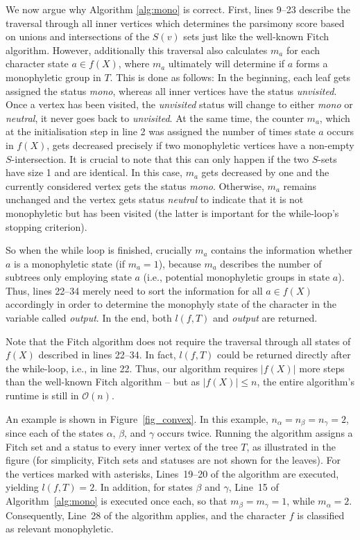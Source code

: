 \documentclass{amsart}
\theoremstyle{definition}
\begin{document}
We now argue why Algorithm \ref{alg:mono} is correct. First, lines 9--23 describe the traversal through all inner vertices which determines the parsimony score based on unions and intersections of the $S(v)$ sets just like the well-known Fitch algorithm. However, additionally this traversal also calculates $m_a$ for each character state $a \in f(X)$, where $m_a$ ultimately will determine if $a$ forms a monophyletic group in $T$. This is done as follows: In the beginning, each leaf gets assigned the status \emph{mono}, whereas all inner vertices have the status \emph{unvisited}. Once a vertex has been visited, the \emph{unvisited} status will change to either \emph{mono} or \emph{neutral}, it never goes back to \emph{unvisited}. At the same time, the counter $m_a$, which at the initialisation step in line 2 was assigned the number of times state $a$ occurs in $f(X)$, gets decreased precisely if two monophyletic vertices have a non-empty $S$-intersection. It is crucial to note that this can only happen if the two $S$-sets have size 1 and are identical. In this case, $m_a$ gets decreased by one and the currently considered vertex gets the status \emph{mono}. Otherwise, $m_a$ remains unchanged and the vertex gets status \emph{neutral} to indicate that it is not monophyletic but has been visited (the latter is important for the while-loop's stopping criterion). 

So when the while loop is finished, crucially $m_a$ contains the information whether $a$ is a monophyletic state (if $m_a=1$), because $m_a$ describes the number of subtrees only employing state $a$ (i.e., potential monophyletic groups in state $a$). Thus, lines 22--34 merely need to sort the information for all $a\in f(X)$ accordingly in order to determine the monophyly state of the character in the variable called \emph{output}. In the end, both $l(f,T)$ and \emph{output} are returned.

Note that the Fitch algorithm does not require the traversal through all states of $f(X)$ described in lines 22--34. In fact, $l(f,T)$ could be returned directly after the while-loop, i.e., in line 22. Thus, our algorithm requires $|f(X)|$  more steps than the well-known Fitch algorithm -- but as $|f(X)|\leq n$, the entire algorithm's runtime is still in $\mathcal{O}(n)$.



\smallskip
An example is shown in Figure~\ref{fig_convex}. In this example, $n_\alpha=n_\beta=n_\gamma=2$, since each of the states $\alpha$, $\beta$, and $\gamma$ occurs twice. Running the algorithm assigns a Fitch set and a status to every inner vertex of the tree $T$, as illustrated in the figure (for simplicity, Fitch sets and statuses are not shown for the leaves). For the vertices marked with asterisks, Lines~19--20 of the algorithm are executed, yielding $l(f,T)=2$. In addition, for states $\beta$ and $\gamma$, Line~15 of Algorithm~\ref{alg:mono} is executed once each, so that $m_\beta=m_\gamma=1$, while $m_\alpha=2$. Consequently, Line~28 of the algorithm applies, and the character $f$ is classified as relevant monophyletic.
\end{document}
